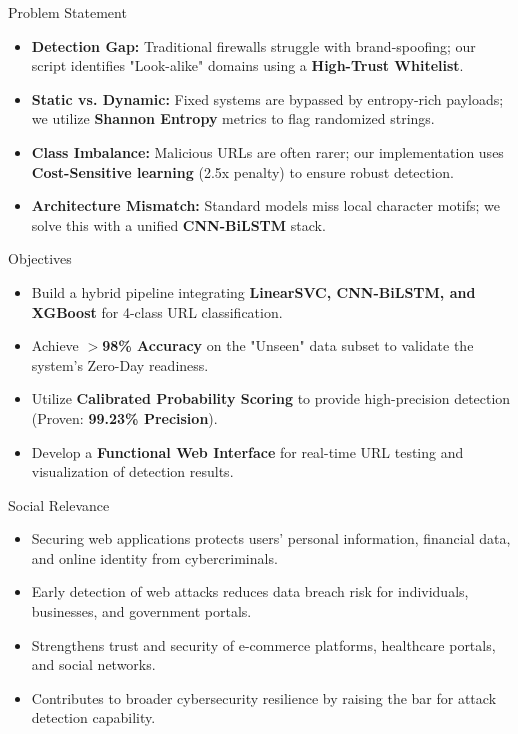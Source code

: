 \documentclass[aspectratio=169,xcolor=dvipsnames]{beamer}
\begin{document}
\begin{frame}{Problem Statement}
\begin{itemize}
    \item \textbf{Detection Gap:} Traditional firewalls struggle with brand-spoofing; our script identifies "Look-alike" domains using a \textbf{High-Trust Whitelist}.
    \item \textbf{Static vs. Dynamic:} Fixed systems are bypassed by entropy-rich payloads; we utilize \textbf{Shannon Entropy} metrics to flag randomized strings.
    \item \textbf{Class Imbalance:} Malicious URLs are often rarer; our implementation uses \textbf{Cost-Sensitive learning} (2.5x penalty) to ensure robust detection.
    \item \textbf{Architecture Mismatch:} Standard models miss local character motifs; we solve this with a unified \textbf{CNN-BiLSTM} stack.
\end{itemize}
\end{frame}

\begin{frame}{Objectives}
\begin{itemize}
    \item Build a hybrid pipeline integrating \textbf{LinearSVC, CNN-BiLSTM, and XGBoost} for 4-class URL classification.
    \item Achieve \textbf{$>$98\% Accuracy} on the "Unseen" data subset to validate the system's Zero-Day readiness.
    \item Utilize \textbf{Calibrated Probability Scoring} to provide high-precision detection (Proven: \textbf{99.23\% Precision}).
    \item Develop a \textbf{Functional Web Interface} for real-time URL testing and visualization of detection results.
\end{itemize}
\end{frame}

\begin{frame}{Social Relevance}
\begin{itemize}
    \item Securing web applications protects users' personal information, financial data, and online identity from cybercriminals.
    \item Early detection of web attacks reduces data breach risk for individuals, businesses, and government portals.
    \item Strengthens trust and security of e-commerce platforms, healthcare portals, and social networks.
    \item Contributes to broader cybersecurity resilience by raising the bar for attack detection capability.
\end{itemize}
\end{frame}
\end{document}
